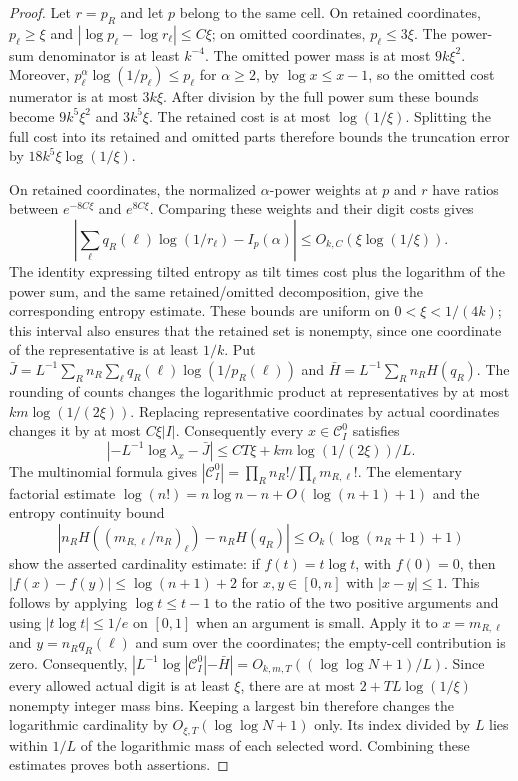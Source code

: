 \begin{proof}
Let $r=p_R$ and let $p$ belong to the same cell. On retained coordinates,
$p_\ell\ge\xi$ and $|\log p_\ell-\log r_\ell|\le C\xi$; on omitted
coordinates, $p_\ell\le3\xi$. The power-sum denominator is at least
$k^{-4}$. The omitted power mass is at most $9k\xi^2$. Moreover,
$p_\ell^\alpha\log(1/p_\ell)\le p_\ell$ for $\alpha\ge2$,
by $\log x\le x-1$, so the omitted cost numerator is at most $3k\xi$.
After division by the full power sum these bounds become $9k^5\xi^2$
and $3k^5\xi$. The retained cost is at most $\log(1/\xi)$. Splitting
the full cost into its retained and omitted parts therefore bounds the
truncation error by $18k^5\xi\log(1/\xi)$.

On retained coordinates, the normalized $\alpha$-power weights at $p$
and $r$ have ratios between $e^{-8C\xi}$ and $e^{8C\xi}$. Comparing
these weights and their digit costs gives
\[
 \left|\sum_\ell q_R(\ell)\log(1/r_\ell)-I_p(\alpha)\right|
 \le O_{k,C}(\xi\log(1/\xi)).
\]
The identity expressing tilted entropy as tilt times cost plus the
logarithm of the power sum, and the same retained/omitted decomposition,
give the corresponding entropy estimate. These bounds are uniform on
$0<\xi<1/(4k)$; this interval also ensures that the retained set is
nonempty, since one coordinate of the representative is at least $1/k$.
Put $\bar J=L^{-1}\sum_R n_R\sum_\ell q_R(\ell)\log(1/p_R(\ell))$
and $\bar H=L^{-1}\sum_R n_RH(q_R)$.
The rounding of counts changes the logarithmic product at representatives
by at most $km\log(1/(2\xi))$.
Replacing representative coordinates by actual coordinates changes it by
at most $C\xi|I|$.  Consequently every $x\in\mathcal C^0_I$ satisfies
\[
 |{-L^{-1}\log\lambda_x}-\bar J|
 \le CT\xi+km\log(1/(2\xi))/L.
\]
The multinomial formula gives
$|\mathcal C^0_I|=\prod_Rn_R!/\prod_\ell m_{R,\ell}!$.
The elementary factorial estimate
$\log(n!)=n\log n-n+O(\log(n+1)+1)$ and the entropy continuity bound
\[
 |n_RH((m_{R,\ell}/n_R)_\ell)-n_RH(q_R)|
 \le O_k(\log(n_R+1)+1)
\]
show the asserted cardinality estimate: if $f(t)=t\log t$, with $f(0)=0$,
then $|f(x)-f(y)|\le\log(n+1)+2$ for $x,y\in[0,n]$ with
$|x-y|\le1$. This follows by applying $\log t\le t-1$ to the ratio of the two positive arguments and using $|t\log t|\le1/e$ on $[0,1]$ when an argument is small. Apply it to
$x=m_{R,\ell}$ and $y=n_Rq_R(\ell)$ and sum over the coordinates;
the empty-cell contribution is zero. Consequently,
$|L^{-1}\log|\mathcal C^0_I|-\bar H|
 =O_{k,m,T}((\log\log N+1)/L)$.
Since every allowed actual digit is at least $\xi$, there are at most
$2+TL\log(1/\xi)$ nonempty integer mass bins.
Keeping a largest bin therefore changes the logarithmic cardinality by
$O_{\xi,T}(\log\log N+1)$ only.  Its index divided by $L$ lies within
$1/L$ of the logarithmic mass of each selected word.
Combining these estimates proves both assertions.
\end{proof}

